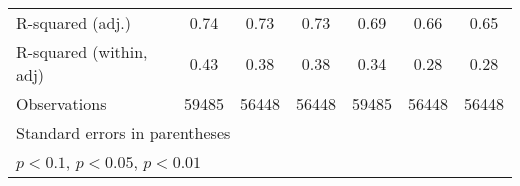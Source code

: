 {\begin{tabular}{l*{6}{c}}
R-squared (adj.)    &        0.74         &        0.73         &        0.73         &        0.69         &        0.66         &        0.65         \\
R-squared (within, adj)&        0.43         &        0.38         &        0.38         &        0.34         &        0.28         &        0.28         \\
Observations        &       59485         &       56448         &       56448         &       59485         &       56448         &       56448         \\
\bottomrule
\multicolumn{7}{l}{\footnotesize Standard errors in parentheses}\\
\multicolumn{7}{l}{\footnotesize \sym{*} \(p<0.1\), \sym{**} \(p<0.05\), \sym{***} \(p<0.01\)}\\
\end{tabular}
}
